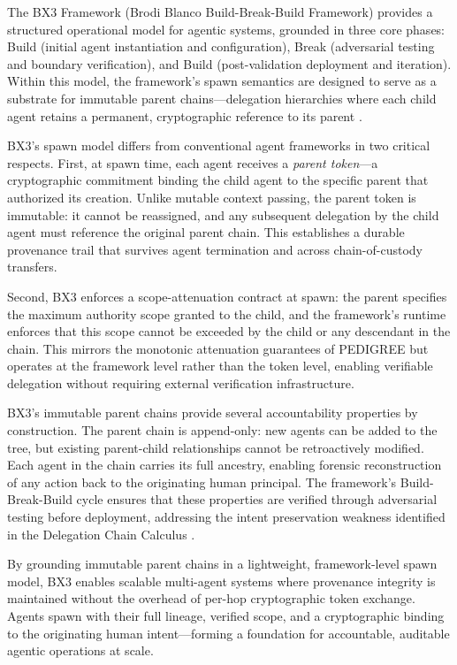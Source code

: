 The BX3 Framework (Brodi Blanco Build-Break-Build Framework) provides a structured operational model for agentic systems, grounded in three core phases: Build (initial agent instantiation and configuration), Break (adversarial testing and boundary verification), and Build (post-validation deployment and iteration). Within this model, the framework's spawn semantics are designed to serve as a substrate for immutable parent chains—delegation hierarchies where each child agent retains a permanent, cryptographic reference to its parent \cite{BX3Spec:2026}.

BX3's spawn model differs from conventional agent frameworks in two critical respects. First, at spawn time, each agent receives a \emph{parent token}—a cryptographic commitment binding the child agent to the specific parent that authorized its creation. Unlike mutable context passing, the parent token is immutable: it cannot be reassigned, and any subsequent delegation by the child agent must reference the original parent chain. This establishes a durable provenance trail that survives agent termination and across chain-of-custody transfers.

Second, BX3 enforces a scope-attenuation contract at spawn: the parent specifies the maximum authority scope granted to the child, and the framework's runtime enforces that this scope cannot be exceeded by the child or any descendant in the chain. This mirrors the monotonic attenuation guarantees of PEDIGREE \cite{PEDIGREE:2024} but operates at the framework level rather than the token level, enabling verifiable delegation without requiring external verification infrastructure.

BX3's immutable parent chains provide several accountability properties by construction. The parent chain is append-only: new agents can be added to the tree, but existing parent-child relationships cannot be retroactively modified. Each agent in the chain carries its full ancestry, enabling forensic reconstruction of any action back to the originating human principal. The framework's Build-Break-Build cycle ensures that these properties are verified through adversarial testing before deployment, addressing the intent preservation weakness identified in the Delegation Chain Calculus \cite{SentinelAgent:2026}.

By grounding immutable parent chains in a lightweight, framework-level spawn model, BX3 enables scalable multi-agent systems where provenance integrity is maintained without the overhead of per-hop cryptographic token exchange. Agents spawn with their full lineage, verified scope, and a cryptographic binding to the originating human intent—forming a foundation for accountable, auditable agentic operations at scale.